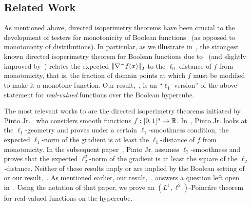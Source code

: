 % 
% 

\subsection{Related Work}\label{sec:related}

As mentioned above, directed isoperimetry theorems have been  crucial to the development of testers for monotonicity of Boolean functions~\cite{GGLRS00,ChSe13-j,KMS18} (as opposed to monotonicity of distributions). In particular, as we illustrate in~, the strongest known directed isoperimetry theorem for Boolean functions due to~\cite{KMS18} (and slightly improved by~\cite{PRW22}) relates the expected $\left\lVert \nabla^-f(x) \right\rVert_2$ to the $\ell_0$-distance of $f$ from monotonicity, that is, the fraction of domain points at which $f$ must be modified to make it a monotone function. Our result,~, is an ``$\ell_1$-version'' of the above statement for {\em real-valued} functions over the Boolean hypercube. 

The most relevant works to  are the directed isoperimetry theorems initiated by Pinto Jr.~\cite{F23, F24} who considers smooth functions $f:[0,1]^n \to \mathbb R$. In~\cite{F23}, Pinto Jr. looks at the $\ell_1$-geometry and proves under a certain $\ell_1$-smoothness condition, the expected $\ell_1$-norm of the gradient is at least the $\ell_1$-distance of $f$ from monotonicity. In the subsequent paper~\cite{F24}, Pinto Jr. assumes $\ell_2$-smoothness and proves that the expected $\ell_2^2$-norm of the gradient is at least the square of the $\ell_2$-distance. Neither of these results imply or are implied by the Boolean setting of~\cite{KMS18} or our result,~. As mentioned earlier, our result,~, answers a question left open in~\cite{F23}.
Using the notation of that paper, we prove an $(L^1, \ell^2)$-Poinc\'{a}re theorem
for real-valued functions on the hypercube.


